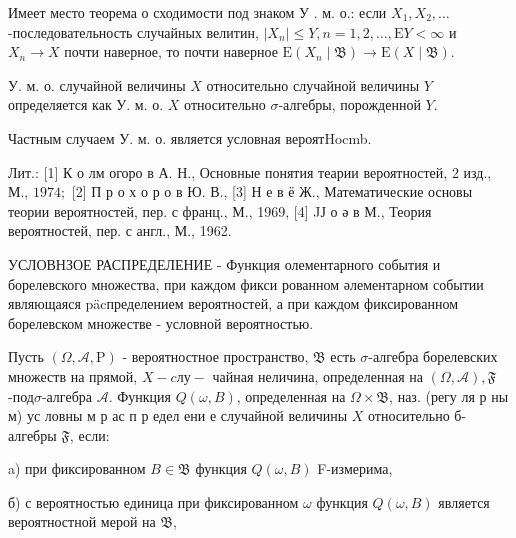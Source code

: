 \documentclass[10pt]{article}
\begin{document}
Имеет место теорема о сходимости под знаком У . м. о.: если $X_{1}, X_{2}, \ldots$-последовательность случайных велитин, $\left|X_{n}\right| \leqslant Y, n=1,2, \ldots, \mathrm{E} Y<\infty$ и $X_{n} \longrightarrow X$ почти наверное, то почти наверное $\mathrm{E}\left(X_{n} \mid \mathfrak{B}\right) \longrightarrow \mathrm{E}(X \mid \mathfrak{B})$.



У. м. о. случайной величины $X$ относительно случайной величины $Y$ определяется как У. м. о. $X$ относительно $\sigma$-алгебры, порожденной $Y$.



Частным случаем У. м. о. является условная вероятHocmb.



Лит.: [1] К о лм огоро в А. Н., Основные понятия теарии вероятностей, 2 изд., М., $1974 ;$ [2] П р о х о р о в Ю. В., [3] Н е в ё Ж., Математические основы теории вероятностей, пер. с франц., М., 1969, [4] JЈ о ә в М., Теория вероятностей, пер. с англ., М., 1962.



УСЛОВНЗОЕ РАСПРЕДЕЛЕНИЕ - Функция олементарного события и борелевского множества, при каждом фикси рованном әлементарном событии являющаяся päcпределением вероятностей, а при каждом фиксированном борелевском множестве - условной вероятностью.



Пусть $(\Omega, \mathcal{A}, \mathrm{P})$ - вероятностное пространство, $\mathfrak{B}$ есть $\sigma$-алгебра борелевских множеств на прямой, $X-c л у-$ чайная неличина, определенная на $(\Omega, \mathcal{A}), \mathfrak{F}$-под$\sigma$-алгебра $\mathcal{A}$. Функция $Q(\omega, B)$, определенная на $\Omega \times \mathfrak{B}$, наз. (регу ля р ны м) ус ловны м р ас п р едел ени е случайной величины $X$ относительно б-алгебры $\mathfrak{F}$, если:



a) при фиксированном $B \in \mathfrak{B}$ функция $Q(\omega, B)$ F-измерима,



б) с вероятностью единица при фиксированном $\omega$ функция $Q(\omega, B)$ является вероятностной мерой на $\mathfrak{B}$,
\end{document}
